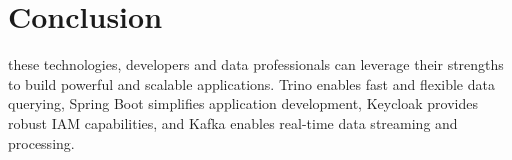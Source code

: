 \section*{Conclusion}
these technologies, developers and data professionals can leverage their strengths to build powerful and scalable applications. Trino enables fast and flexible data querying, Spring Boot simplifies application development, Keycloak provides robust IAM capabilities, and Kafka enables real-time data streaming and processing.